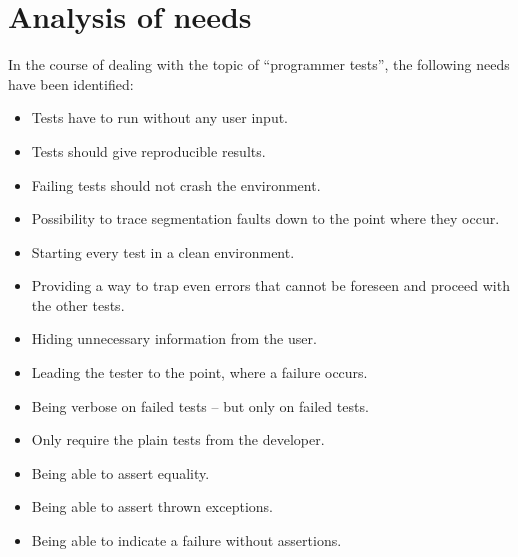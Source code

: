 %                                                                        
%                                                                        
%                                                                        
%                                                                        
%
\clearpage
\section{Analysis of needs}

In the course of dealing with the topic of ``programmer tests'', the following needs have been identified:

\begin{itemize}

\item Tests have to run without any user input.
\item Tests should give reproducible results.

\item Failing tests should not crash the environment.
\item Possibility to trace segmentation faults down to the point where they occur.
\item Starting every test in a clean environment.
\item Providing a way to trap even errors that cannot be foreseen and proceed with the other tests.

\item Hiding unnecessary information from the user.
\item Leading the tester to the point, where a failure occurs.
\item Being verbose on failed tests -- but only on failed tests.
\item Only require the plain tests from the developer.

\item Being able to assert equality.
\item Being able to assert thrown exceptions.
\item Being able to indicate a failure without assertions.

\end{itemize}
